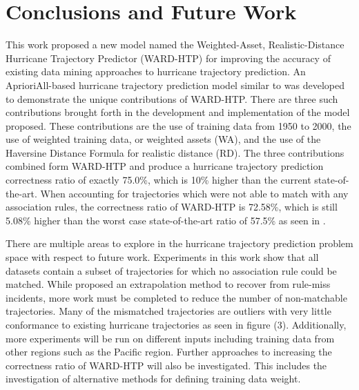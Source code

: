 \documentclass[12pt,conference]{IEEEtran}
\begin{document}
\section{Conclusions and Future Work} %

This work proposed a new model named the Weighted-Asset, Realistic-Distance Hurricane Trajectory Predictor (WARD-HTP) for improving the accuracy of existing data mining approaches to hurricane trajectory prediction. An AprioriAll-based hurricane trajectory prediction model similar to \cite{major-hurricane-model} was developed to demonstrate the unique contributions of WARD-HTP. There are three such contributions brought forth in the development and implementation of the model proposed. These contributions are the use of training data from 1950 to 2000, the use of weighted training data, or weighted assets (WA), and the use of the Haversine Distance Formula for realistic distance (RD). The three contributions combined form WARD-HTP and produce a hurricane trajectory prediction correctness ratio of exactly 75.0\%, which is 10\% higher than the current state-of-the-art. When accounting for trajectories which were not able to match with any association rules, the correctness ratio of WARD-HTP is 72.58\%, which is still 5.08\% higher than the worst case state-of-the-art ratio of 57.5\% as seen in \cite{major-hurricane-model}.

There are multiple areas to explore in the hurricane trajectory prediction problem space with respect to future work. Experiments in this work show that all datasets contain a subset of trajectories for which no association rule could be matched. While \cite{major-hurricane-model} proposed an extrapolation method to recover from rule-miss incidents, more work must be completed to reduce the number of non-matchable trajectories. Many of the mismatched trajectories are outliers with very little conformance to existing hurricane trajectories as seen in figure (3). Additionally, more experiments will be run on different inputs including training data from other regions such as the Pacific region. Further approaches to increasing the correctness ratio of WARD-HTP will also be investigated. This includes the investigation of alternative methods for defining training data weight.
\end{document}
